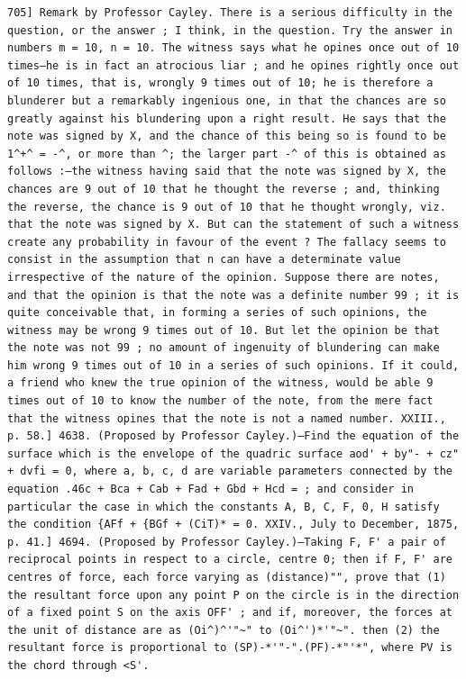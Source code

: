 \documentclass[11pt,a4paper]{book}
\begin{document}
\newpage
\setcounter{page}{589}
\begin{verbatim}
705] Remark by Professor Cayley. There is a serious difficulty in the question, or the answer ; I think, in the question. Try the answer in numbers m = 10, n = 10. The witness says what he opines once out of 10 times—he is in fact an atrocious liar ; and he opines rightly once out of 10 times, that is, wrongly 9 times out of 10; he is therefore a blunderer but a remarkably ingenious one, in that the chances are so greatly against his blundering upon a right result. He says that the note was signed by X, and the chance of this being so is found to be 1^+^ = -^, or more than ^; the larger part -^ of this is obtained as follows :—the witness having said that the note was signed by X, the chances are 9 out of 10 that he thought the reverse ; and, thinking the reverse, the chance is 9 out of 10 that he thought wrongly, viz. that the note was signed by X. But can the statement of such a witness create any probability in favour of the event ? The fallacy seems to consist in the assumption that n can have a determinate value irrespective of the nature of the opinion. Suppose there are notes, and that the opinion is that the note was a definite number 99 ; it is quite conceivable that, in forming a series of such opinions, the witness may be wrong 9 times out of 10. But let the opinion be that the note was not 99 ; no amount of ingenuity of blundering can make him wrong 9 times out of 10 in a series of such opinions. If it could, a friend who knew the true opinion of the witness, would be able 9 times out of 10 to know the number of the note, from the mere fact that the witness opines that the note is not a named number. XXIII., p. 58.] 4638. (Proposed by Professor Cayley.)—Find the equation of the surface which is the envelope of the quadric surface aod' + by"- + cz" + dvfi = 0, where a, b, c, d are variable parameters connected by the equation .46c + Bca + Cab + Fad + Gbd + Hcd = ; and consider in particular the case in which the constants A, B, C, F, 0, H satisfy the condition {AFf + {BGf + (CiT)* = 0. XXIV., July to December, 1875, p. 41.] 4694. (Proposed by Professor Cayley.)—Taking F, F' a pair of reciprocal points in respect to a circle, centre 0; then if F, F' are centres of force, each force varying as (distance)"", prove that (1) the resultant force upon any point P on the circle is in the direction of a fixed point S on the axis OFF' ; and if, moreover, the forces at the unit of distance are as (Oi^)^'"~" to (Oi^')*'"~". then (2) the resultant force is proportional to (SP)-*'"-".(PF)-*"'*", where PV is the chord through <S'. 
\end{verbatim}
\end{document}

